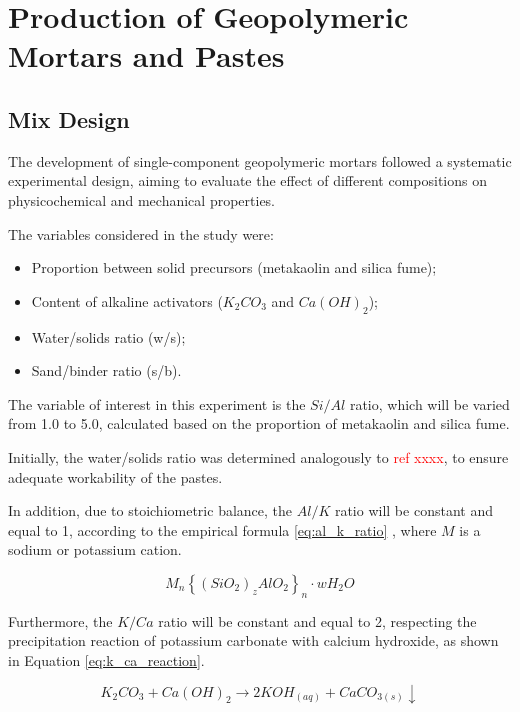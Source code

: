 \section{Production of Geopolymeric Mortars and Pastes}
\label{sec:production_geopolymeric_mortars_pastes}

\subsection{Mix Design}
\label{subsec:mix_design}

The development of single-component geopolymeric mortars followed a systematic experimental design, aiming to evaluate the effect of different compositions on physicochemical and mechanical properties.

The variables considered in the study were:

\begin{itemize}
    \item Proportion between solid precursors (metakaolin and silica fume);
    \item Content of alkaline activators ($K_2CO_3$ and $Ca(OH)_2$);
    \item Water/solids ratio (w/s);
    \item Sand/binder ratio (s/b).
\end{itemize}

The variable of interest in this experiment is the $Si/Al$ ratio, which will be varied from 1.0 to 5.0, calculated based on the proportion of metakaolin and silica fume.

Initially, the water/solids ratio was determined analogously to \textcolor{red}{ref xxxx}, to ensure adequate workability of the pastes.

In addition, due to stoichiometric balance, the $Al/K$ ratio will be constant and equal to 1, according to the empirical formula \ref{eq:al_k_ratio} \cite{joseph1991geopolymers}, where $M$ is a sodium or potassium cation.

\begin{equation}
    \label{eq:al_k_ratio}
    M_n \left\{ \left(SiO_2 \right)_z AlO_2 \right\}_n \cdot wH_2O
\end{equation}

Furthermore, the $K/Ca$ ratio will be constant and equal to 2, respecting the precipitation reaction of potassium carbonate with calcium hydroxide, as shown in Equation \ref{eq:k_ca_reaction}.

\begin{equation}
    \label{eq:k_ca_reaction}
    K_2CO_3 + Ca(OH)_2 \rightarrow  2KOH_{(aq)} + CaCO_{3(s)} \downarrow
\end{equation}


